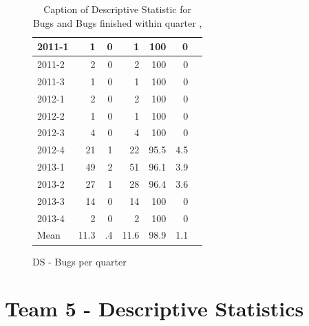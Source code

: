 \documentclass[UKenglish]{ifimaster}  %
\begin{document}
\begin{appendices}
\begin{table}[!htbp]
\begin{adjustwidth}{-1.5cm}{}
\begin{subfigure}[b]{0.4\textwidth}
{\begin{tabular}{ | l | r | r | r | r | r | r | }
2011-1 & 1 & 0 & 1 & 100 & 0 \\ \hline
2011-2 & 2 & 0 & 2 & 100 & 0 \\ \hline
2011-3 & 1 & 0 & 1 & 100 & 0 \\ \hline
2012-1 & 2 & 0 & 2 & 100 & 0 \\ \hline
2012-2 & 1 & 0 & 1 & 100 & 0 \\ \hline
2012-3 & 4 & 0 & 4 & 100 & 0 \\ \hline
2012-4 & 21 & 1 & 22 & 95.5 & 4.5 \\ \hline
2013-1 & 49 & 2 & 51 & 96.1& 3.9\\ \hline
2013-2 & 27 & 1 & 28 & 96.4 & 3.6 \\ \hline
2013-3 & 14 & 0 & 14 & 100 & 0 \\ \hline
2013-4 & 2 & 0 & 2 & 100 & 0 \\ \hline
Mean & 11.3&.4&11.6&98.9&1.1 \\ \hline


\end{tabular}
}
\caption{DS - Bugs per quarter}
 \label{DS:FTPQ:4}
\end{subfigure}
\end{adjustwidth}
\caption[Optional caption for list of figures]{Caption of Descriptive Statistic for Bugs and Bugs finished within quarter  , }
\label{DS:4:5} %
\end{table}
 


\section{Team 5 - Descriptive Statistics}


\end{appendices}
\end{document}
